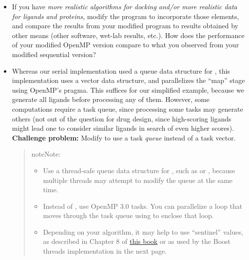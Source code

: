 \documentclass[letterpaper,10pt,openany,oneside]{sphinxmanual}
\begin{document}
\begin{itemize}
\item {} 
If you have \emph{more realistic algorithms for docking and/or more realistic data for ligands and proteins}, modify the program  to incorporate those elements, and compare the results from your modified program to results obtained by other means (other software, wet-lab results, etc.). How does the performance of your modified OpenMP version compare to what you observed from your modified sequential version?

\item {} 
Whereas our serial implementation used a queue data structure for , this implementation uses a vector data structure, and parallelizes the “map” stage using OpenMP’s  pragma. This suffices for our simplified example, because we generate all ligands before processing any of them. However, some computations require a task queue, since processing some tasks may generate others (not out of the question for drug design, since high-scoring ligands might lead one to consider similar ligands in search of even higher scores). \textbf{Challenge problem:} Modify  to use a task \emph{queue} instead of a task vector.
\begin{quote}

\begin{notice}{note}{Note:}\begin{itemize}
\item {} 
Use a thread-safe queue data structure for , such as  or , because multiple threads may attempt to modify the queue at the same time.

\item {} 
Instead of , use OpenMP 3.0 tasks.  You can parallelize a  loop that moves through the task queue using  to enclose that loop.

\item {} 
Depending on your algorithm, it may help to use “sentinel” values, as described in Chapter 8 of \href{http://books.google.com/books/about/The\_Art\_of\_Concurrency.html?id=rU68SYVS7S8C}{this book} or as used by the Boost threads implementation in the next page.

\end{itemize}
\end{notice}
\end{quote}

\end{itemize}
\end{document}
